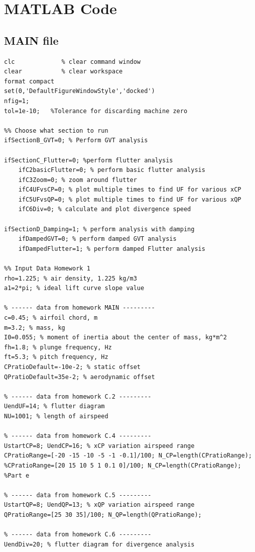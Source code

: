 \documentclass{article}
\begin{document}
\section{MATLAB Code}
\subsection{MAIN file}

\begin{lstlisting}[caption={Main analysis script for Homework 1.}, label={lst:main_script}]
%% Initialization
clc             % clear command window
clear           % clear workspace
format compact
set(0,'DefaultFigureWindowStyle','docked')
nfig=1;
tol=1e-10;   %Tolerance for discarding machine zero

%% Choose what section to run
ifSectionB_GVT=0; % Perform GVT analysis

ifSectionC_Flutter=0; %perform flutter analysis
    ifC2basicFlutter=0; % perform basic flutter analysis
    ifC3Zoom=0; % zoom around flutter
    ifC4UFvsCP=0; % plot multiple times to find UF for various xCP
    ifC5UFvsQP=0; % plot multiple times to find UF for various xQP
    ifC6Div=0; % calculate and plot divergence speed

ifSectionD_Damping=1; % perform analysis with damping
    ifDampedGVT=0; % perform damped GVT analysis
    ifDampedFlutter=1; % perform damped Flutter analysis

%% Input Data Homework 1
rho=1.225; % air density, 1.225 kg/m3
a1=2*pi; % ideal lift curve slope value

% ------ data from homework MAIN ---------
c=0.45; % airfoil chord, m
m=3.2; % mass, kg
I0=0.055; % moment of inertia about the center of mass, kg*m^2
fh=1.8; % plunge frequency, Hz
ft=5.3; % pitch frequency, Hz
CPratioDefault=-10e-2; % static offset
QPratioDefault=35e-2; % aerodynamic offset

% ------ data from homework C.2 ---------
UendUF=14; % flutter diagram
NU=1001; % length of airspeed

% ------ data from homework C.4 ---------
UstartCP=8; UendCP=16; % xCP variation airspeed range
CPratioRange=[-20 -15 -10 -5 -1 -0.1]/100; N_CP=length(CPratioRange);
%CPratioRange=[20 15 10 5 1 0.1 0]/100; N_CP=length(CPratioRange); %Part e

% ------ data from homework C.5 ---------
UstartQP=8; UendQP=13; % xQP variation airspeed range
QPratioRange=[25 30 35]/100; N_QP=length(QPratioRange);

% ------ data from homework C.6 ---------
UendDiv=20; % flutter diagram for divergence analysis


\end{lstlisting}
\end{document}
